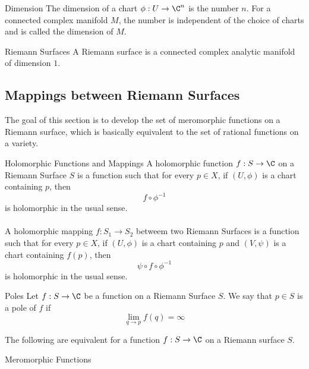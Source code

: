 \documentclass[a4paper]{article}
\begin{document}
\begin{defn}{Dimension}{} The dimension of a chart $\phi:U\to\C^n$ is the number $n$. For a connected complex manifold $M$, the number is independent of the choice of charts and is called the dimension of $M$. 
\end{defn}

\begin{defn}{Riemann Surfaces}{} A Riemann surface is a connected complex analytic manifold of dimension $1$. 
\end{defn}

\subsection{Mappings between Riemann Surfaces}
The goal of this section is to develop the set of meromorphic functions on a Riemann surface, which is basically equivalent to the set of rational functions on a variety. 

\begin{defn}{Holomorphic Functions and Mappings}{} A holomorphic function $f:S\to\C$ on a Riemann Surface $S$ is a function such that for every $p\in X$, if $(U,\phi)$ is a chart containing $p$, then $$f\circ\phi^{-1}$$ is holomorphic in the usual sense. \\~\\
A holomorphic mapping $f:S_1\to S_2$ betweem two Riemann Surfaces is a function such that for every $p\in X$, if $(U,\phi)$ is a chart containing $p$ and $(V,\psi)$ is a chart containing $f(p)$, then $$\psi\circ f\circ\phi^{-1}$$ is holomorphic in the usual sense. 
\end{defn}

\begin{defn}{Poles}{} Let $f:S\to\C$ be a function on a Riemann Surface $S$. We say that $p\in S$ is a pole of $f$ if $$\lim_{q\to p}f(q)=\infty$$
\end{defn}

\begin{prp}{}{} The following are equivalent for a function $f:S\to\C$ on a Riemann surface $S$. 
\end{prp}

\begin{defn}{Meromorphic Functions}{}
\end{defn}
\end{document}
